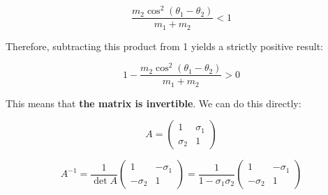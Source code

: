 \documentclass[11pt,a4paper]{article}
\begin{document}
\[ \frac{m_2 \cos^2(\theta_1 - \theta_2)}{m_1 + m_2} < 1 \]

Therefore, subtracting this product from 1 yields a strictly positive result:

\[ 1 - \frac{m_2 \cos^2(\theta_1 - \theta_2)}{m_1 + m_2} > 0 \]

This means that \textbf{the matrix is invertible}. We can do this directly:

\[ A = \begin{pmatrix} 1 & \sigma_1 \\ \sigma_2 & 1 \end{pmatrix} \]

\[ A^{-1} = \frac{1}{\det A} \begin{pmatrix} 1 & -\sigma_1 \\ -\sigma_2 & 1 \end{pmatrix} = \frac{1}{1 - \sigma_1 \sigma_2} \begin{pmatrix} 1 & -\sigma_1 \\ -\sigma_2 & 1 \end{pmatrix} \]
\end{document}
